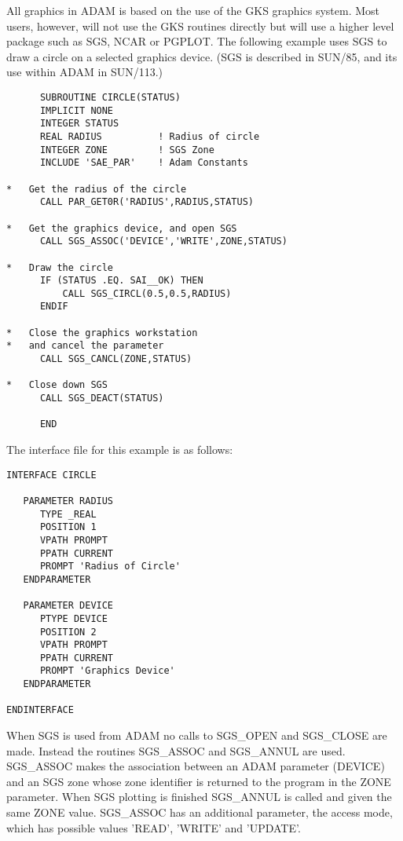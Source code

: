 \documentclass[twoside,11pt]{report}
\begin{document}
All graphics in ADAM is based on the use of the GKS graphics system. Most
users, however, will not use the GKS routines directly but will use a
higher level package such as SGS, NCAR or PGPLOT. The following example
uses SGS to draw a circle on a selected graphics device.
(SGS is described in SUN/85, and its use within ADAM in SUN/113.) 
\begin{verbatim}
      SUBROUTINE CIRCLE(STATUS)
      IMPLICIT NONE
      INTEGER STATUS
      REAL RADIUS          ! Radius of circle               
      INTEGER ZONE         ! SGS Zone
      INCLUDE 'SAE_PAR'    ! Adam Constants
                         
*   Get the radius of the circle
      CALL PAR_GET0R('RADIUS',RADIUS,STATUS)

*   Get the graphics device, and open SGS
      CALL SGS_ASSOC('DEVICE','WRITE',ZONE,STATUS)

*   Draw the circle
      IF (STATUS .EQ. SAI__OK) THEN
          CALL SGS_CIRCL(0.5,0.5,RADIUS)
      ENDIF

*   Close the graphics workstation 
*   and cancel the parameter
      CALL SGS_CANCL(ZONE,STATUS)

*   Close down SGS
      CALL SGS_DEACT(STATUS)

      END                  
\end{verbatim}
           
The interface file for this example is as follows:

\begin{verbatim}
INTERFACE CIRCLE

   PARAMETER RADIUS
      TYPE _REAL
      POSITION 1
      VPATH PROMPT
      PPATH CURRENT
      PROMPT 'Radius of Circle'
   ENDPARAMETER

   PARAMETER DEVICE
      PTYPE DEVICE
      POSITION 2
      VPATH PROMPT
      PPATH CURRENT
      PROMPT 'Graphics Device'
   ENDPARAMETER

ENDINTERFACE
\end{verbatim}                

When SGS is used from ADAM no calls to SGS\_OPEN and SGS\_CLOSE are made.
Instead the routines SGS\_ASSOC and SGS\_ANNUL are used. SGS\_ASSOC makes
the association between an ADAM parameter (DEVICE) and an SGS zone whose
zone identifier is returned to the program in the ZONE parameter. When
SGS plotting is finished SGS\_ANNUL is called and given the same ZONE
value. SGS\_ASSOC has an additional parameter, the access mode, which has
possible values 'READ', 'WRITE' and 'UPDATE'.
\end{document}
